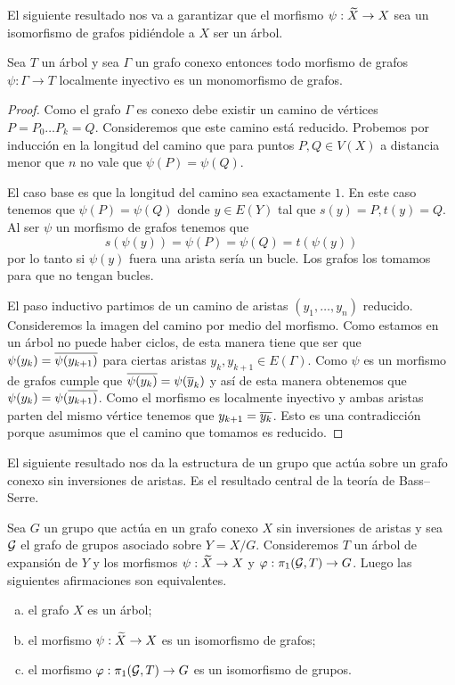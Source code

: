 \documentclass[tesis.tex]{subfiles}
\begin{document}
El siguiente resultado nos va a garantizar que el morfismo $\psi: \widetilde X \to X$ sea un isomorfismo de grafos pidiéndole a $X$ ser un árbol.

\begin{prop}\label{prop_loc_iny}
	Sea $T$ un árbol y sea $\Gamma$ un grafo conexo entonces todo morfismo de grafos $\psi:\Gamma \to T$ localmente inyectivo es un monomorfismo de grafos.    
\end{prop}
\begin{proof}
	Como el grafo $\Gamma$ es conexo debe existir un camino de vértices $P=P_0 \dots P_k=Q$.
	Consideremos que este camino está reducido.
	Probemos por inducción en la longitud del camino que para puntos $P,Q \in V(X)$ a distancia menor que $n$ no vale que $\psi(P) = \psi(Q)$.
	
	El caso base es que la longitud del camino sea exactamente $1$.
	En este caso tenemos que $\psi(P) = \psi(Q)$ donde $y \in E(Y)$ tal que $s(y)= P, t(y) = Q$.
	Al ser $\psi$ un morfismo de grafos tenemos que 
	\begin{equation*}
		s(\psi(y)) = \psi(P) = \psi (Q) = t(\psi(y))
	\end{equation*}
	por lo tanto si $\psi(y)$ fuera una arista sería un bucle.
	Los grafos los tomamos para que no tengan bucles.
	
	El paso inductivo partimos de un camino de aristas $(y_1, \dots, y_n)$ reducido.
	Consideremos la imagen del camino por medio del morfismo.
	Como estamos en un árbol no puede haber ciclos, de esta manera tiene que ser que $\psi(y_k) = \overline{\psi (y_{k+1})}$ para ciertas aristas $y_k, y_{k+1} \in E(\Gamma)$.
	Como $\psi$ es un morfismo de grafos cumple que $\overline {\psi(y_k)} = \psi(\overline y_k)$ y así de esta manera obtenemos que $\psi(y_k) =  \psi(\overline{y_{k+1})}$.
	Como el morfismo es localmente inyectivo y ambas aristas parten del mismo vértice tenemos que $y_{k+1} = \overline{y_k}$. Esto es una contradicción porque asumimos que el camino que tomamos es reducido.    
\end{proof}

El siguiente resultado nos da la estructura de un grupo que actúa sobre un grafo conexo sin inversiones de aristas. 
Es el resultado central de la teoría de Bass--Serre.

\begin{teo}\label{teo_Serre}
	Sea $G$ un grupo que actúa en un grafo conexo $X$ sin inversiones de aristas y sea ${\cal G}$ el grafo de grupos asociado sobre $Y = X / G$.
	Consideremos $T$ un árbol de expansión de $Y$ y los morfismos $\psi: \widetilde X \to X$ y $\varphi: \pi_1({\cal G}, T) \to G$.
	Luego las siguientes afirmaciones son equivalentes.
	\begin{enumerate}[(a)]
		\item el grafo $X$ es un árbol;
		\item el morfismo $\psi: \widetilde X \to X$ es un isomorfismo de grafos;
		\item el morfismo $\varphi:\pi_1({\cal G}, T) \to G$ es un isomorfismo de grupos.
	\end{enumerate}
\end{teo}
\end{document}
